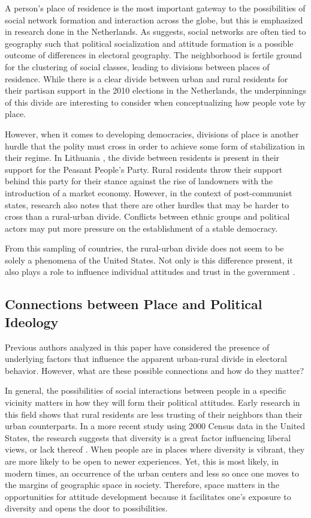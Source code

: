 \documentclass[12pt, titlepage]{article}
\begin{document}
A person's place of residence is the most important gateway to the possibilities of social network formation and interaction across the globe, but this is emphasized in research done in the Netherlands. As \cite{van_gent_right-wing_2014} suggests, social networks are often tied to geography such that political socialization and attitude formation is a possible outcome of differences in electoral geography. The neighborhood is fertile ground for the clustering of social classes, leading to divisions between places of residence. While there is a clear divide between urban and rural residents for their partisan support in the 2010 elections in the Netherlands, the underpinnings of this divide are interesting to consider when conceptualizing how people vote by place.

However, when it comes to developing democracies, divisions of place is another hurdle that the polity must cross in order to achieve some form of stabilization in their regime. In Lithuania \citep{jurkynas_emerging_2004}, the divide between residents is present in their support for the Peasant People's Party. Rural residents throw their support behind this party for their stance against the rise of landowners with the introduction of a market economy. However, in the context of post-communist states, research also notes that there are other hurdles that may be harder to cross than a rural-urban divide. Conflicts between ethnic groups and political actors may put more pressure on the establishment of a stable democracy. 

From this sampling of countries, the rural-urban divide does not seem to be solely a phenomena of the United States. Not only is this difference present, it also plays a role to influence individual attitudes and trust in the government \citep{ahn_political_1986}. 

\subsection{Connections between Place and Political Ideology}

Previous authors analyzed in this paper have considered the presence of underlying factors that influence the apparent urban-rural divide in electoral behavior. However, what are these possible connections and how do they matter? 

In general, the possibilities of social interactions between people in a specific vicinity  matters in how they will form their political attitudes. Early research in this field \citep{glenn_rural-urban_1967} shows that rural residents are less trusting of their neighbors than their urban counterparts.  In a more recent study using 2000 Census data in the United States, the research suggests that diversity is a great factor influencing liberal views, or lack thereof \citep{williamson_sprawl_2008}. When people are in places where diversity is vibrant, they are more likely to be open to newer experiences. Yet, this is most likely, in modern times, an occurrence of the urban centers and less so once one moves to the margins of geographic space in society. Therefore, space matters in the opportunities for attitude development because it facilitates one's exposure to diversity and opens the door to possibilities.
\end{document}
